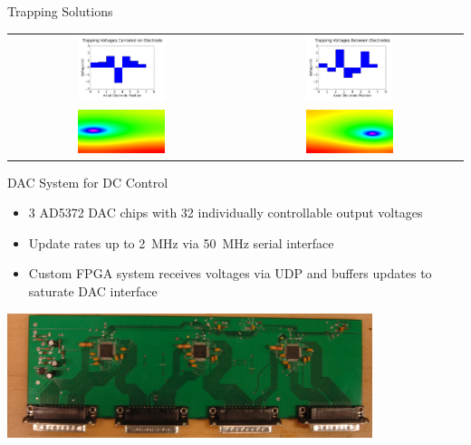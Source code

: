 \documentclass{beamer}
\begin{document}
\begin{frame}{Trapping Solutions}
	\begin{table}\begin{tabular}{cc}
		\centering
		\includegraphics[width=0.4\textwidth]{center_trap} &
		\includegraphics[width=0.4\textwidth]{inbetween_trap}  \\
		
		\includegraphics[width=0.4\textwidth]{yz_all_left} &
		\includegraphics[width=0.4\textwidth]{yz_all}
	\end{tabular}\end{table}
\end{frame}


\begin{frame}{DAC System for DC Control}
	\centering
	\begin{itemize}
		\item 3 AD5372 DAC chips with 32 individually controllable output voltages
		\item Update rates up to 2~MHz via 50~MHz serial interface
		\item Custom FPGA system receives voltages via UDP and buffers updates to saturate DAC interface
	\end{itemize}
	\vfill
	\centerline{\includegraphics[width=0.8\textwidth]{DAC_board}}
\end{frame}
\end{document}
